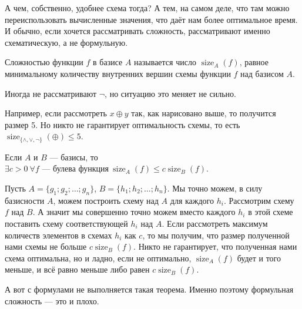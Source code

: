 \documentclass{article}
\begin{document}
\begin{itemize}
\begin{Proof}
        \end{Proof}
        \begin{Comment}
            А чем, собственно, удобнее схема тогда? А тем, на самом деле, что там можно переиспользовать вычисленные значения, что даёт нам более оптимальное время. И обычно, если хочется рассматривать сложность, рассматривают именно схематическую, а не формульную.
        \end{Comment}
        \dfn Сложностью функции $f$ в базисе $A$ называется число $\operatorname{size}_A(f)$, равное минимальному количеству внутренних вершин схемы функции $f$ над базисом $A$.
        \begin{Comment}
            Иногда не рассматривают $\neg$, но ситуацию это меняет не сильно.
        \end{Comment}
        \begin{Example}
            Например, если рассмотреть $x\oplus y$ так, как нарисовано выше, то получится размер 5. Но никто не гарантирует оптимальность схемы, то есть $\operatorname{size}_{\{\land,\lor,\neg\}}(\oplus)\leqslant 5$.
        \end{Example}
        \thm Если $A$ и $B$ --- базисы, то $\exists c>0~\forall f\text{ --- булева функция}~\operatorname{size}_A(f)\leqslant c\operatorname{size}_B(f)$.
        \begin{Proof}
            Пусть $A=\{g_1;g_2;\ldots;g_n\}$, $B=\{h_1;h_2;\ldots;h_n\}$. Мы точно можем, в силу базисности $A$, можем построить схему над $A$ для каждого $h_i$. Рассмотрим схему $f$ над $B$. А значит мы совершенно точно можем вместо каждого $h_i$ в этой схеме поставить схему соответствующей $h_i$ над $A$. Если рассмотреть максимум количеств элементов в схемах $h_i$ как $c$, то мы получим, что размер полученной нами схемы не больше $c\operatorname{size}_B(f)$. Никто не гарантирует, что полученная нами схема оптимальна, но и ладно, если не оптимально, $\operatorname{size}_A(f)$ будет и того меньше, и всё равно меньше либо равен $c\operatorname{size}_B(f)$.
        \end{Proof}
        \begin{Comment}
            А вот с формулами не выполняется такая теорема. Именно поэтому формульная сложность --- это и плохо.

\end{Comment}
\end{itemize}
\end{document}
